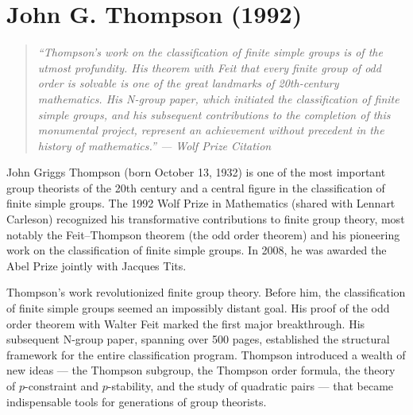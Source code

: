 \let\R\relax
\newcommand{\R}{\mathbb{R}}
\let\C\relax
\newcommand{\C}{\mathbb{C}}
\let\N\relax
\newcommand{\N}{\mathbb{N}}
\let\Z\relax
\newcommand{\Z}{\mathbb{Z}}
\let\Q\relax
\newcommand{\Q}{\mathbb{Q}}
\let\SO\relax
\newcommand{\SO}{\operatorname{SO}}
\let\SL\relax
\newcommand{\SL}{\operatorname{SL}}
\let\GL\relax
\newcommand{\GL}{\operatorname{GL}}
\let\Sp\relax
\newcommand{\Sp}{\operatorname{Sp}}
\let\SU\relax
\newcommand{\SU}{\operatorname{SU}}
\let\PSL\relax
\newcommand{\PSL}{\operatorname{PSL}}
\let\Aut\relax
\newcommand{\Aut}{\operatorname{Aut}}
\let\St\relax
\newcommand{\St}{\operatorname{St}}
\let\GV\relax
\newcommand{\GV}{\operatorname{GV}}
\let\E\relax
\newcommand{\E}{\operatorname{E}}
\let\F\relax
\newcommand{\F}{\mathbb{F}}

\chapter{John G. Thompson (1992)}

\begin{quote}
\it ``Thompson's work on the classification of finite simple groups is of the utmost profundity. His theorem with Feit that every finite group of odd order is solvable is one of the great landmarks of 20th-century mathematics. His N-group paper, which initiated the classification of finite simple groups, and his subsequent contributions to the completion of this monumental project, represent an achievement without precedent in the history of mathematics.'' --- Wolf Prize Citation
\end{quote}

John Griggs Thompson (born October 13, 1932) is one of the most important group theorists of the 20th century and a central figure in the classification of finite simple groups. The 1992 Wolf Prize in Mathematics (shared with Lennart Carleson) recognized his transformative contributions to finite group theory, most notably the Feit--Thompson theorem (the odd order theorem) and his pioneering work on the classification of finite simple groups. In 2008, he was awarded the Abel Prize jointly with Jacques Tits.

Thompson's work revolutionized finite group theory. Before him, the classification of finite simple groups seemed an impossibly distant goal. His proof of the odd order theorem with Walter Feit marked the first major breakthrough. His subsequent N-group paper, spanning over 500 pages, established the structural framework for the entire classification program. Thompson introduced a wealth of new ideas --- the Thompson subgroup, the Thompson order formula, the theory of \(p\)-constraint and \(p\)-stability, and the study of quadratic pairs --- that became indispensable tools for generations of group theorists.

